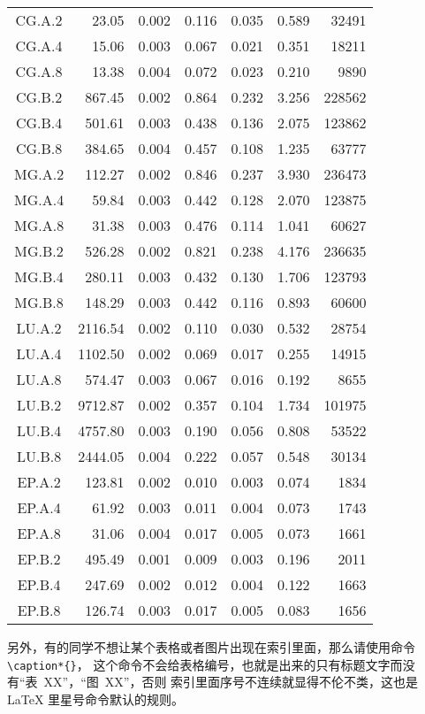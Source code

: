 \begin{longtable}[c]{c*{6}{r}}
\endfoot%
\endlastfoot%
CG.A.2 & 23.05   & 0.002 & 0.116 & 0.035 & 0.589 & 32491  \\
CG.A.4 & 15.06   & 0.003 & 0.067 & 0.021 & 0.351 & 18211  \\
CG.A.8 & 13.38   & 0.004 & 0.072 & 0.023 & 0.210 & 9890   \\
CG.B.2 & 867.45  & 0.002 & 0.864 & 0.232 & 3.256 & 228562 \\
CG.B.4 & 501.61  & 0.003 & 0.438 & 0.136 & 2.075 & 123862 \\
CG.B.8 & 384.65  & 0.004 & 0.457 & 0.108 & 1.235 & 63777  \\
MG.A.2 & 112.27  & 0.002 & 0.846 & 0.237 & 3.930 & 236473 \\
MG.A.4 & 59.84   & 0.003 & 0.442 & 0.128 & 2.070 & 123875 \\
MG.A.8 & 31.38   & 0.003 & 0.476 & 0.114 & 1.041 & 60627  \\
MG.B.2 & 526.28  & 0.002 & 0.821 & 0.238 & 4.176 & 236635 \\
MG.B.4 & 280.11  & 0.003 & 0.432 & 0.130 & 1.706 & 123793 \\
MG.B.8 & 148.29  & 0.003 & 0.442 & 0.116 & 0.893 & 60600  \\
LU.A.2 & 2116.54 & 0.002 & 0.110 & 0.030 & 0.532 & 28754  \\
LU.A.4 & 1102.50 & 0.002 & 0.069 & 0.017 & 0.255 & 14915  \\
LU.A.8 & 574.47  & 0.003 & 0.067 & 0.016 & 0.192 & 8655   \\
LU.B.2 & 9712.87 & 0.002 & 0.357 & 0.104 & 1.734 & 101975 \\
LU.B.4 & 4757.80 & 0.003 & 0.190 & 0.056 & 0.808 & 53522  \\
LU.B.8 & 2444.05 & 0.004 & 0.222 & 0.057 & 0.548 & 30134  \\
EP.A.2 & 123.81  & 0.002 & 0.010 & 0.003 & 0.074 & 1834   \\
EP.A.4 & 61.92   & 0.003 & 0.011 & 0.004 & 0.073 & 1743   \\
EP.A.8 & 31.06   & 0.004 & 0.017 & 0.005 & 0.073 & 1661   \\
EP.B.2 & 495.49  & 0.001 & 0.009 & 0.003 & 0.196 & 2011   \\
EP.B.4 & 247.69  & 0.002 & 0.012 & 0.004 & 0.122 & 1663   \\
EP.B.8 & 126.74  & 0.003 & 0.017 & 0.005 & 0.083 & 1656   \\
\bottomrule[1.5pt]
\end{longtable}

另外，有的同学不想让某个表格或者图片出现在索引里面，那么请使用命令 \verb|\caption*{}|，
这个命令不会给表格编号，也就是出来的只有标题文字而没有“表~XX”，“图~XX”，否则
索引里面序号{\kai 不连续}就显得不伦不类，这也是 \LaTeX{} 里星号命令默认的规则。

